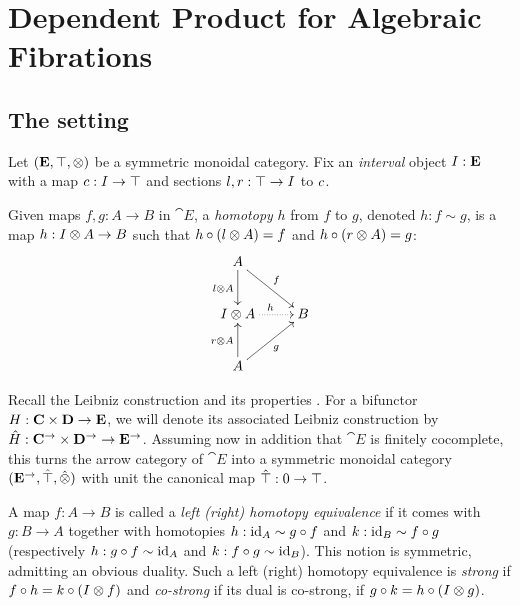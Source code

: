 \documentclass[reqno,10pt,a4paper,oneside]{amsart}
\begin{document}
\section{Dependent Product for Algebraic Fibrations}

\subsection{The setting}

Let $(\mathbf{E}, \top, \otimes)$ be a symmetric monoidal category.
Fix an \emph{interval} object $I : \mathbf{E}$ with a map $c : I \to \top$ and sections $l, r : \top \to I$ to $c$.

\begin{definition}
\label{def:homotopy}
Given maps $f, g : A \to B$ in $\cat{E}$, a \emph{homotopy} $h$ from $f$ to $g$, denoted $h : f \sim g$, is a map $h : I \otimes A \to B$ such that $h \mathbin{\circ} (l \otimes A) = f$ and $h \mathbin{\circ} (r \otimes A) = g$:
\[
\xymatrix{
  A
  \ar[dr]^{f}
  \ar[d]_{\intervall \otimes A}
\\
  \interval \otimes A
  \ar@{.>}[r]^{h}
&
  B
\\
  A
  \ar[u]^{\intervalr \otimes A}
  \ar[ur]_{g}
}
\]
\end{definition}

Recall the Leibniz construction and its properties \cite[Section 4]{riehl-verity:reedy}.
For a bifunctor $H : \mathbf{C} \times \mathbf{D} \to \mathbf{E}$, we will denote its associated Leibniz construction by $\hat{H} : \mathbf{C}^{\to} \times \mathbf{D}^{\to} \to \mathbf{E}^{\to}$.
Assuming now in addition that $\cat{E}$ is finitely cocomplete, this turns the arrow category of $\cat{E}$ into a symmetric monoidal category $(\mathbf{E}^{\to}, \hat{\top}, \mathbin{\hat{\otimes}})$ with unit the canonical map $\hat{\top} : 0 \to \top$.

\begin{definition}
\label{def:homotopy-equivalence}
A map $f : A \to B$ is called a \emph{left (right) homotopy equivalence} if it comes with $g : B \to A$ together with homotopies $h : \operatorname{id}_A \sim g \mathbin{\circ} f$ and $k : \operatorname{id}_B \sim f \mathbin{\circ} g$ (respectively $h : g \mathbin{\circ} f \sim \operatorname{id}_A$ and $k : f \mathbin{\circ} g \sim \operatorname{id}_B$).
This notion is symmetric, admitting an obvious duality.
Such a left (right) homotopy equivalence is \emph{strong} if $f \mathbin{\circ} h = k \mathbin{\circ} (I \otimes f)$ and \emph{co-strong} if its dual is co-strong, \ie if $g \mathbin{\circ} k = h \mathbin{\circ} (I \otimes g)$.
%
\end{definition}
\end{document}
